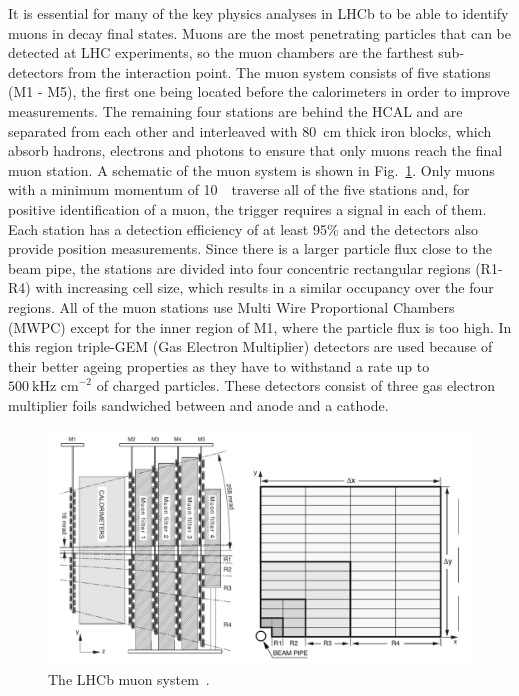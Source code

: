 It is essential for many of the key physics analyses in LHCb to be able to identify muons in decay final states.
Muons are the most penetrating particles that can be detected at LHC experiments, so the muon chambers
are the farthest sub-detectors from the interaction point. The muon system consists of five stations (M1 - M5),
the first one being located before the calorimeters in order to improve \pt measurements. The remaining four stations
are behind the HCAL and are separated from each other and interleaved with 80~cm thick iron blocks, which absorb
hadrons, electrons and photons to ensure that only muons reach the final muon station. 
A schematic of the muon system is shown in Fig.~\ref{fig:muonsystem}.
Only muons with a minimum momentum of 10~\gevc~traverse all of the
five stations and, for positive identification of a muon, the trigger requires a signal in each of them.
Each station has a detection efficiency of at least 95\% and the detectors also provide position measurements.
Since there is a larger particle flux close to the beam pipe, the stations are divided
into four concentric rectangular regions (R1-R4) with increasing cell size, which %
results in a similar occupancy over the four regions. All of the muon stations use
Multi Wire Proportional Chambers (MWPC) except for the inner region of M1, where the particle flux is too high.
In this region triple-GEM (Gas Electron Multiplier) detectors are used because of their better ageing properties
as they have to withstand a rate up to $500 ~\mbox{kHz cm}^{-2}$ of charged particles. 
These detectors consist of three gas electron multiplier foils sandwiched between and anode and a cathode.
%
\begin{figure}[h!]
\centering \includegraphics[width=1.0\textwidth]{Detector/figs/muon.png}
\caption{The LHCb muon system~\cite{Alves:2008zz}.}
\label{fig:muonsystem}
\end{figure}

